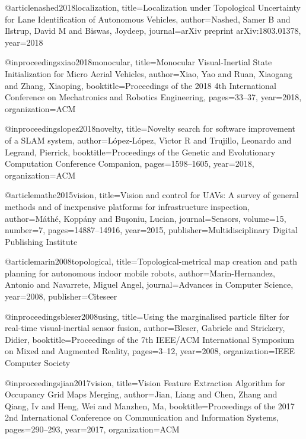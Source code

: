 @article{nashed2018localization,
  title={Localization under Topological Uncertainty for Lane Identification of Autonomous Vehicles},
  author={Nashed, Samer B and Ilstrup, David M and Biswas, Joydeep},
  journal={arXiv preprint arXiv:1803.01378},
  year={2018}
}

@inproceedings{xiao2018monocular,
  title={Monocular Visual-Inertial State Initialization for Micro Aerial Vehicles},
  author={Xiao, Yao and Ruan, Xiaogang and Zhang, Xiaoping},
  booktitle={Proceedings of the 2018 4th International Conference on Mechatronics and Robotics Engineering},
  pages={33--37},
  year={2018},
  organization={ACM}
}

@inproceedings{lopez2018novelty,
  title={Novelty search for software improvement of a SLAM system},
  author={L{\'o}pez-L{\'o}pez, V{\'\i}ctor R and Trujillo, Leonardo and Legrand, Pierrick},
  booktitle={Proceedings of the Genetic and Evolutionary Computation Conference Companion},
  pages={1598--1605},
  year={2018},
  organization={ACM}
}

@article{mathe2015vision,
  title={Vision and control for UAVs: A survey of general methods and of inexpensive platforms for infrastructure inspection},
  author={M{\'a}th{\'e}, Kopp{\'a}ny and Bu{\c{s}}oniu, Lucian},
  journal={Sensors},
  volume={15},
  number={7},
  pages={14887--14916},
  year={2015},
  publisher={Multidisciplinary Digital Publishing Institute}
}

@article{marin2008topological,
  title={Topological-metrical map creation and path planning for autonomous indoor mobile robots},
  author={Marin-Hernandez, Antonio and Navarrete, Miguel Angel},
  journal={Advances in Computer Science},
  year={2008},
  publisher={Citeseer}
}

@inproceedings{bleser2008using,
  title={Using the marginalised particle filter for real-time visual-inertial sensor fusion},
  author={Bleser, Gabriele and Strickery, Didier},
  booktitle={Proceedings of the 7th IEEE/ACM International Symposium on Mixed and Augmented Reality},
  pages={3--12},
  year={2008},
  organization={IEEE Computer Society}
}

@inproceedings{jian2017vision,
  title={Vision Feature Extraction Algorithm for Occupancy Grid Maps Merging},
  author={Jian, Liang and Chen, Zhang and Qiang, Iv and Heng, Wei and Manzhen, Ma},
  booktitle={Proceedings of the 2017 2nd International Conference on Communication and Information Systems},
  pages={290--293},
  year={2017},
  organization={ACM}
}


